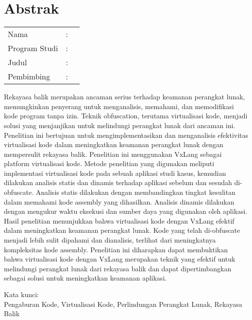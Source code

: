%
%
%

\chapter*{Abstrak}

\vspace*{0.2cm}
{
	\setlength{\parindent}{0pt}

	\begin{tabular}{@{}l l p{10cm}}
		Nama          & : & \penulis    \\
		Program Studi & : & \program    \\
		Judul         & : & \judul      \\
		Pembimbing    & : & \pembimbing \\
	\end{tabular}

	\bigskip
	\bigskip

Rekayasa balik merupakan ancaman serius terhadap keamanan perangkat lunak, memungkinkan penyerang untuk menganalisis, memahami, dan memodifikasi kode program tanpa izin. Teknik obfuscation, terutama virtualisasi kode, menjadi solusi yang menjanjikan untuk melindungi perangkat lunak dari ancaman ini. Penelitian ini bertujuan untuk mengimplementasikan dan menganalisis efektivitas virtualisasi kode dalam meningkatkan keamanan perangkat lunak dengan mempersulit rekayasa balik. Penelitian ini menggunakan VxLang sebagai platform virtualisasi kode. Metode penelitian yang digunakan meliputi implementasi virtualisasi kode pada sebuah aplikasi studi kasus, kemudian dilakukan analisis statis dan dinamis terhadap aplikasi sebelum dan sesudah di-obfuscate. Analisis statis dilakukan dengan membandingkan tingkat kesulitan dalam memahami kode assembly yang dihasilkan. Analisis dinamis dilakukan dengan mengukur waktu eksekusi dan sumber daya yang digunakan oleh aplikasi. Hasil penelitian menunjukkan bahwa virtualisasi kode dengan VxLang efektif dalam meningkatkan keamanan perangkat lunak. Kode yang telah di-obfuscate menjadi lebih sulit dipahami dan dianalisis, terlihat dari meningkatnya kompleksitas kode assembly. Penelitian ini diharapkan dapat membuktikan bahwa virtualisasi kode dengan VxLang merupakan teknik yang efektif untuk melindungi perangkat lunak dari rekayasa balik dan dapat dipertimbangkan sebagai solusi untuk meningkatkan keamanan aplikasi.

	\bigskip

	Kata kunci:\\
	Pengaburan Kode, Virtualisasi Kode, Perlindungan Perangkat Lunak, Rekayasa Balik
}

\newpage
